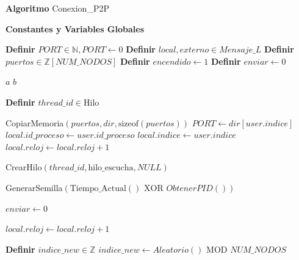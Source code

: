 \begin{tcolorbox}[colback=white, colframe=azul_unam, title=Pseudocódigo: cnx\_lamport.c (Conexión P2P), breakable]

\textbf{Algoritmo} Conexion\_P2P


\textbf{Constantes y Variables Globales}

\begin{algorithmic}[1]

\State \textbf{Definir} $PORT \in \mathbb{N}, PORT \gets 0$
\State \textbf{Definir} $local, externo \in Mensaje\_L$
\State \textbf{Definir} $puertos \in \mathbb{Z}[NUM\_NODOS]$
\State \textbf{Definir} $encendido \gets 1$
\State \textbf{Definir} $enviar \gets 0$

\vspace{0.2cm}


        \State \Return $a$
    \Else
        \State \Return $b$
    \EndIf
\EndProcedure

\vspace{0.3cm}



    \State \textbf{Definir} $thread\_id \in \text{Hilo}$
    
    \State CopiarMemoria$(puertos, dir, \text{sizeof}(puertos))$
    \State $PORT \gets dir[user.indice]$
    \State $local.id\_proceso \gets user.id\_proceso$
    \State $local.indice \gets user.indice$
    \State $local.reloj \gets local.reloj + 1$ 

    \State CrearHilo$(thread\_id, \text{hilo\_escucha}, NULL)$
    
    \State GenerarSemilla$(\text{Tiempo\_Actual}() \text{ XOR } ObtenerPID())$

    
            \State $enviar \gets 0$
            
            \State $local.reloj \gets local.reloj + 1$ 
            
            \State \textbf{Definir} $indice\_new \in \mathbb{Z}$
            \Repeat
                \State $indice\_new \gets Aleatorio() \text{ MOD } NUM\_NODOS$
            

\end{algorithmic}
\end{tcolorbox}
